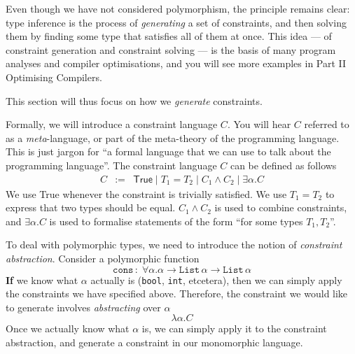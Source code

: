 {Even though we have not considered polymorphism, the principle remains clear: type inference is the process of \textit{generating} a set of constraints, and then solving them by finding some type that satisfies all of them at once. This idea --- of constraint generation and constraint solving --- is the basis of many program analyses and compiler optimisations, and you will see more examples in \textsf{Part II Optimising Compilers}.

This section will thus focus on how we \textit{generate} constraints.

Formally, we will introduce a constraint language $C$. You will hear $C$ referred to as a \textit{meta}-language, or part of the meta-theory of the programming language. This is just jargon for ``a formal language that we can use to talk about the programming language''. The constraint language $C$ can be defined as follows
\[\begin{array}{lcl}
     C&:=&\textsf{True} \mid T_1 = T_2 \mid C_1 \land C_2 \mid \exists \alpha . C 
     \end{array}\]
We use \textsf{True} whenever the constraint is trivially satisfied. We use $T_1 = T_2$ to express that two types should be equal. $C_1 \land C_2$ is used to combine constraints, and $\exists \alpha. C$ is used to formalise statements of the form ``for some types $T_1, T_2$''. 

To deal with polymorphic types, we need to introduce the notion of \textit{constraint abstraction}. Consider a polymorphic function
\[ \texttt{cons}\, : \; \forall \alpha . \alpha \to \texttt{List} \, \alpha \to \texttt{List} \, \alpha \]
\textbf{If} we know what $\alpha$ actually is (\texttt{bool}, \texttt{int}, etcetera), then we can simply apply the constraints we have specified above. Therefore, the constraint we would like to generate involves \textit{abstracting} over $\alpha$
\[\lambda \alpha. C\]
Once we actually know what $\alpha$ is, we can simply apply it to the constraint abstraction, and generate a constraint in our monomorphic language.

}
